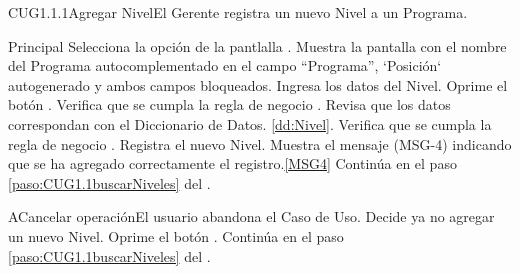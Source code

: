 	\begin{UseCase}{CUG1.1.1}{Agregar Nivel}{El Gerente registra un nuevo Nivel a un Programa.}
	\end{UseCase}

	\begin{UCtrayectoria}{Principal}
			\UCpaso[\UCactor] Selecciona la opción  de la pantlalla .
			\UCpaso Muestra la pantalla  con el nombre del Programa autocomplementado en el campo ``Programa'', `Posición` autogenerado y ambos campos bloqueados.
			\UCpaso [\UCactor] Ingresa los datos del Nivel. \label{paso:CUG1.1.1IngresaDatosNivel}
			\UCpaso [\UCactor] Oprime el botón .
			\UCpaso Verifica que se cumpla la regla de negocio .  
			\UCpaso Revisa que los datos correspondan con el Diccionario de Datos. \ref{dd:Nivel}. 
			\UCpaso Verifica que se cumpla la regla de negocio .  
			\UCpaso Registra el nuevo Nivel.
			\UCpaso Muestra el mensaje (MSG-4) indicando que se ha agregado correctamente el registro.\ref{MSG4}
			\UCpaso Continúa en el paso \ref{paso:CUG1.1buscarNiveles} del .
	\end{UCtrayectoria}

	\begin{UCtrayectoriaA}{A}{Cancelar operación}{El usuario abandona el Caso de Uso.}
			\UCpaso[\UCactor] Decide ya no agregar un nuevo Nivel.
			\UCpaso[\UCactor] Oprime el botón .
			\UCpaso Continúa en el paso \ref{paso:CUG1.1buscarNiveles} del .
	\end{UCtrayectoriaA}
		
